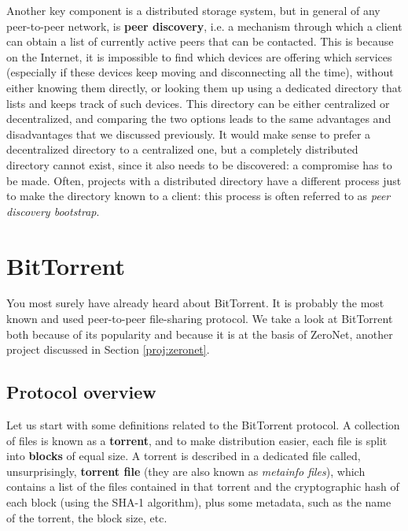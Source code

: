 \documentclass[mscthesis]{usiinfthesis}
\begin{document}
Another key component is a distributed storage system, but in general of any peer-to-peer network, is \textbf{peer discovery}, i.e. a mechanism through which a client can obtain a list of currently active peers that can be contacted. This is because on the Internet, it is impossible to find which devices are offering which services (especially if these devices keep moving and disconnecting all the time), without either knowing them directly, or looking them up using a dedicated directory that lists and keeps track of such devices. This directory can be either centralized or decentralized, and comparing the two options leads to the same advantages and disadvantages that we discussed previously. It would make sense to prefer a decentralized directory to a centralized one, but a completely distributed directory cannot exist, since it also needs to be discovered: a compromise has to be made. Often, projects with a distributed directory have a different process just to make the directory known to a client: this process is often referred to as \textit{peer discovery bootstrap}.


\section{BitTorrent}\label{proj:bittorrent}

You most surely have already heard about BitTorrent. It is probably the most known and used peer-to-peer file-sharing protocol. We take a look at BitTorrent both because of its popularity and because it is at the basis of ZeroNet, another project discussed in Section \ref{proj:zeronet}.

\subsection{Protocol overview}

Let us start with some definitions related to the BitTorrent protocol. A collection of files is known as a \textbf{torrent}, and to make distribution easier, each file is split into \textbf{blocks} of equal size. A torrent is described in a dedicated file called, unsurprisingly, \textbf{torrent file} (they are also known as \textit{metainfo files}), which contains a list of the files contained in that torrent and the cryptographic hash of each block (using the SHA-1 algorithm), plus some metadata, such as the name of the torrent, the block size, etc.
\end{document}
